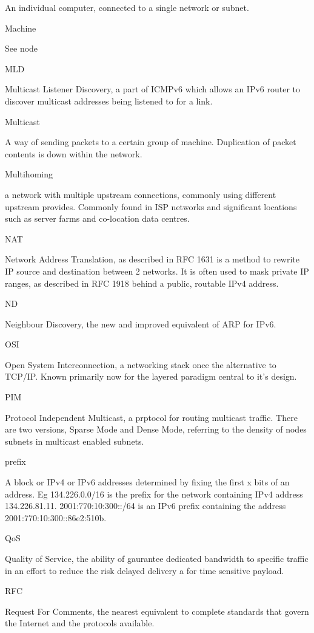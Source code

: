 An individual computer, connected to a single network or subnet.

Machine

See node

MLD

Multicast Listener Discovery, a part of ICMPv6 which allows an IPv6
router to discover multicast addresses being listened to for a link.

Multicast

A way of sending packets to a certain group of machine. Duplication of
packet contents is down within the network.

Multihoming

a network with multiple upstream connections, commonly using different
upstream provides. Commonly found in ISP networks and significant
locations such as server farms and co-location data centres.

NAT

Network Address Translation, as described in RFC 1631 is a method
to rewrite IP source and destination between 2 networks. It is often
used to mask private IP ranges, as described in RFC 1918 behind a 
public, routable IPv4 address. 

ND

Neighbour Discovery, the new and improved equivalent of ARP for IPv6.

OSI

Open System Interconnection, a networking stack once the alternative to
TCP/IP. Known primarily now for the layered paradigm central to it's
design.

PIM

Protocol Independent Multicast, a prptocol for routing multicast
traffic. There are two versions, Sparse Mode and Dense Mode, referring
to the density of nodes subnets in multicast enabled subnets.

prefix

A block or IPv4 or IPv6 addresses determined by fixing the first x bits
of an address. Eg 134.226.0.0/16 is the prefix for the network
containing IPv4 address 134.226.81.11. 2001:770:10:300::/64 is an IPv6
prefix containing the address 2001:770:10:300::86e2:510b. 

QoS

Quality of Service, the ability of gaurantee dedicated bandwidth to
specific traffic in an effort to reduce the risk delayed delivery a for
time sensitive payload.

RFC

Request For Comments, the nearest equivalent to complete standards that
govern the Internet and the protocols available.

